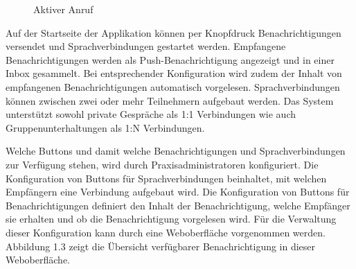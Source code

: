 \begin{figure}[h]
\begin{minipage}[b]{0.4\textwidth}
        \caption{Aktiver Anruf}
    \end{minipage}
    \label{fig:MobileClient-ScreensIntroduction}
\end{figure}

Auf der Startseite der Applikation können per Knopfdruck Benachrichtigungen versendet und Sprachverbindungen gestartet werden.
Empfangene Benachrichtigungen werden als Push-Benachrichtigung angezeigt und in einer Inbox gesammelt.
Bei entsprechender Konfiguration wird zudem der Inhalt von empfangenen Benachrichtigungen automatisch vorgelesen.
Sprachverbindungen können zwischen zwei oder mehr Teilnehmern aufgebaut werden.
Das System unterstützt sowohl private Gespräche als 1:1 Verbindungen wie auch Gruppenunterhaltungen als 1:N Verbindungen.

Welche Buttons und damit welche Benachrichtigungen und Sprachverbindungen zur Verfügung stehen, wird durch Praxisadministratoren konfiguriert.
Die Konfiguration von Buttons für Sprachverbindungen beinhaltet, mit welchen Empfängern eine Verbindung aufgebaut wird.
Die Konfiguration von Buttons für Benachrichtigungen definiert den Inhalt der Benachrichtigung, welche Empfänger sie erhalten und ob die Benachrichtigung vorgelesen wird.
Für die Verwaltung dieser Konfiguration kann durch eine Weboberfläche vorgenommen werden.
Abbildung 1.3 zeigt die Übersicht verfügbarer Benachrichtigung in dieser Weboberfläche.

